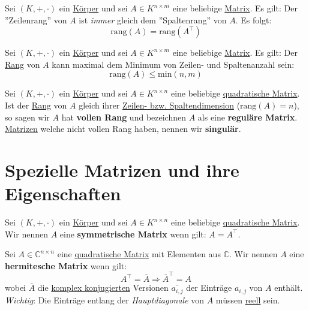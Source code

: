 \documentclass[../../main.tex]{subfiles}
\begin{document}
	\begin{theorem}
		Sei $(K,+,\cdot)$ ein \hyperref[def:Körper]{Körper} und sei $A\in K^{n \times m}$ eine beliebige \hyperref[def:Matrix]{Matrix}. Es gilt: Der ''Zeilenrang'' von $A$ ist \textit{immer} gleich dem ''Spaltenrang'' von $A$. Es folgt: $$\textrm{rang}(A) = \textrm{rang}(A^\top)$$
	\end{theorem}
	
	\begin{theorem}
		Sei $(K,+,\cdot)$ ein \hyperref[def:Körper]{Körper} und sei $A\in K^{n \times m}$ eine beliebige \hyperref[def:Matrix]{Matrix}. Es gilt: Der \hyperref[def:RangMatrix]{Rang} von $A$ kann maximal dem Minimum von Zeilen- und Spaltenanzahl sein: $$\textrm{rang}(A) \leq \textrm{min}(n,m)$$
	\end{theorem}
	
	\begin{definition}
		\label{def:reguläreMatrix}
		\label{def:singuläreMatrix}
		\label{def:vollerRang}
		Sei $(K,+,\cdot)$ ein \hyperref[def:Körper]{Körper} und sei $A\in K^{n \times n}$ eine beliebige \hyperref[def:QuadratischeMatrix]{quadratische Matrix}. Ist der \hyperref[def:RangMatrix]{Rang} von $A$ gleich ihrer \hyperref[def:DimensionMatrix]{Zeilen- bzw. Spaltendimension} ($\textrm{rang}(A)=n$), so sagen wir $A$ hat \textbf{vollen Rang} und bezeichnen $A$ als eine \textbf{reguläre Matrix}. \hyperref[def:Matrix]{Matrizen} welche nicht vollen Rang haben, nennen wir \textbf{singulär}. 
	\end{definition}


	\section{Spezielle Matrizen und ihre Eigenschaften}	
	
	\begin{definition}
		\label{def:SymmetrischeMatrix}
		Sei $(K,+,\cdot)$ ein \hyperref[def:Körper]{Körper} und sei $A\in K^{n \times n}$ eine beliebige \hyperref[def:QuadratischeMatrix]{quadratische Matrix}. Wir nennen $A$ eine \textbf{symmetrische Matrix} wenn gilt: $A=A^\top$. 
	\end{definition}

	\begin{definition}
		\label{def:HermitescheMatrix}
		Sei $A \in \mathbb{C}^{n \times n}$ eine \hyperref[def:QuadratischeMatrix]{quadratische Matrix} mit Elementen aus $\mathbb{C}$. Wir nennen $A$ eine \textbf{hermitesche Matrix} wenn gilt: $$A^\top = \overline{A} \Rightarrow \overline{A}^\top = A$$ wobei $\overline{A}$ die \hyperref[def:komplexKonjugiert]{komplex konjugierten} Versionen $\overline{a_{i,j}}$ der Einträge $a_{i,j}$ von $A$ enthält. \textit{Wichtig}: Die Einträge entlang der \textit{Hauptdiagonale} von $A$ müssen \hyperref[def:ReelleZahlen]{reell} sein. 
	\end{definition}
\end{document}
